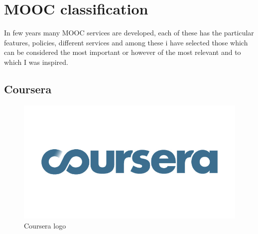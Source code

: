 \section{MOOC classification}
\label{sec:mooc_classification}

In few years many MOOC services are developed, each of these has the particular features, policies, different services and among these i have selected those which can be considered the most important or however of the most relevant and to which I was inspired.

\subsection{Coursera}
\label{subsec:coursera}

\begin{figure}[htb] %
 \centering
 \includegraphics[width=1.0\linewidth]{images/chapter1/coursera.jpg}\hfill
 \caption[Coursera logo]{Coursera logo}
 \label{fig:fourV}
\end{figure}


